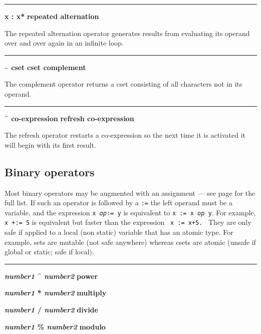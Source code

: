 \bigskip\hrule\vspace{0.1cm}
\noindent
{\bf {\textbar} x : x* } \hfill {\bf repeated alternation}

\noindent
The repeated alternation operator generates
results from evaluating its operand over and over again in an infinite
loop.

\bigskip\hrule\vspace{0.1cm}
\noindent
{\bf \~{} cset } \hfill {\bf cset complement}

\noindent
The complement operator returns a cset
consisting of all characters not in its operand.

\bigskip\hrule\vspace{0.1cm}
\noindent
{\bf \^{} co{}-expression } \hfill {\bf refresh co{}-expression}

\noindent
{}The refresh operator restarts a
co-expression so the next time it is activated it will begin with its
first result.

\subsection*{Binary operators}

Most binary operators may be augmented with an
assignment
--- see page \pageref{AugOps} for the full list.
If such an operator is followed
by a \texttt{:=} the left operand must be a variable, and the
expression \texttt{x }\texttt{\textit{op}}\texttt{:= y} is equivalent
to \texttt{x := x }\texttt{\textit{op}}\texttt{ y}. For example,
\texttt{x +:= 5} is equivalent but faster than the expression
\ \texttt{x := x+5.}
 \
They are only safe if applied to a local (non static) variable that
has an atomic type. For example, sets are mutable (not safe anywhere)
whereas csets are atomic (unsafe if global or static; safe if local).

\bigskip\hrule\vspace{0.1cm}
\noindent
{\bf \textit{number1} \^{} \textit{number2} } \hfill {\bf power}
\index{power, exponent \^{}}

\noindent
{\bf \textit{number1} * \textit{number2} } \hfill {\bf multiply}

\noindent
{\bf \textit{number1} / \textit{number2} } \hfill {\bf divide}

\noindent
{\bf \textit{number1} \% \textit{number2} } \hfill {\bf modulo}

